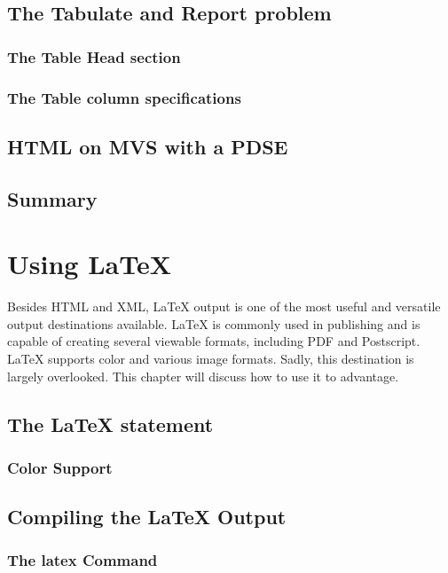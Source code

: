 \documentclass{book}
\begin{document}
\section{The Tabulate and Report problem}

\subsection{The Table Head section}

\subsection{The Table column specifications}

\section{HTML on MVS with a PDSE}

\section{Summary}

\chapter{Using LaTeX}
Besides HTML and XML, LaTeX output is one of the most useful
and versatile output destinations available.  LaTeX is commonly
used in publishing and is capable of creating several viewable
formats, including PDF and Postscript.  LaTeX supports color
and various image formats.
Sadly, this destination is largely overlooked.
This chapter will discuss how to use it to advantage. 
\section{The LaTeX statement}

\subsection{Color Support}

\section{Compiling the LaTeX Output}

\subsection{The latex Command}
\end{document}
